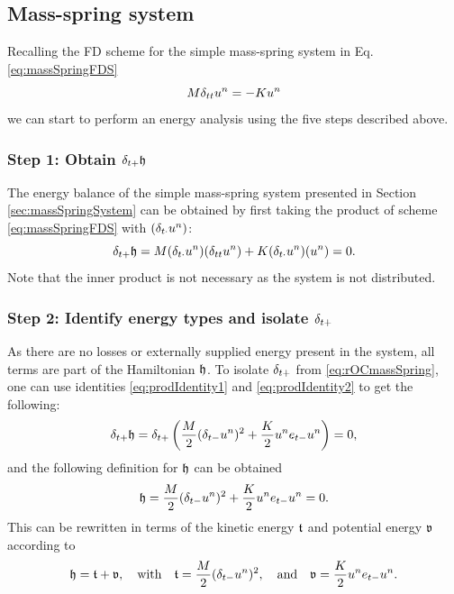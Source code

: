 {{\subsection{Mass-spring system}
Recalling the FD scheme for the simple mass-spring system in Eq. \eqref{eq:massSpringFDS}
\begin{equation*}
    M\delta_{tt} u^n = -Ku^n
\end{equation*}
we can start to perform an energy analysis using the five steps described above. 

\subsubsection{Step 1: Obtain $\delta_{t+} \mathfrak{h}$}
The energy balance of the simple mass-spring system presented in Section \ref{sec:massSpringSystem} can be obtained by first taking the product of scheme \eqref{eq:massSpringFDS} with $(\delta_{t\cdot} u^n)$:
\begin{equation}\label{eq:rOCmassSpring}
    \delta_{t+} \mathfrak{h} = M(\delta_{t\cdot}u^n)(\delta_{tt} u^n) + K(\delta_{t\cdot}u^n)(u^n) = 0.
\end{equation}
Note that the inner product is not necessary as the system is not distributed.

\subsubsection{Step 2: Identify energy types and isolate $\delta_{t+}$}
As there are no losses or externally supplied energy present in the system, all terms are part of the Hamiltonian $\mathfrak{h}$. To isolate $\delta_{t+}$ from \eqref{eq:rOCmassSpring}, one can use identities \eqref{eq:prodIdentity1} and \eqref{eq:prodIdentity2} to get the following:
\begin{equation}
    \delta_{t+} \mathfrak{h} = \delta_{t+}\left(\frac{M}{2}(\delta_{t-}u^n)^2 + \frac{K}{2}u^n e_{t-}u^n\right) = 0,
\end{equation}
and the following definition for $\mathfrak{h}$ can be obtained
\begin{equation}
    \mathfrak{h} = \frac{M}{2}(\delta_{t-}u^n)^2 + \frac{K}{2}u^n e_{t-}u^n = 0.
\end{equation}
This can be rewritten in terms of the kinetic energy $\mathfrak{t}$ and potential energy $\mathfrak{v}$ according to
\begin{equation}\label{eq:energyBalanceMassSpring}
    \mathfrak{h} = \mathfrak{t} + \mathfrak{v}, \quad \text{with} \quad
    \mathfrak{t} = \frac{M}{2}(\delta_{t-}u^n)^2, \quad \text{and} \quad \mathfrak{v} = \frac{K}{2}u^n e_{t-}u^n.
\end{equation} 

}}
